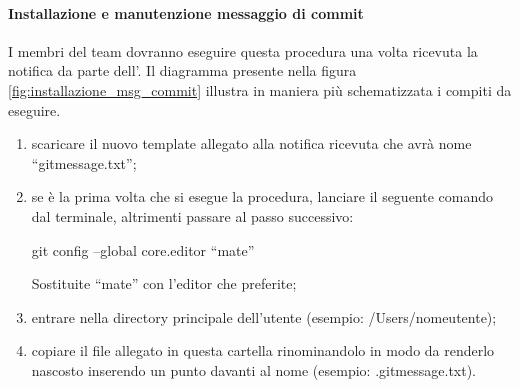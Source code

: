 			\paragraph{Installazione e manutenzione messaggio di commit}
			\label{sec:installazione_msg_commit}
			I membri del team dovranno eseguire questa procedura una volta ricevuta la notifica da parte dell'\roleAdministrator. \newline
			Il diagramma presente nella figura \ref{fig:installazione_msg_commit} illustra in maniera più schematizzata i compiti da eseguire.
				\begin{enumerate}
					\item scaricare il nuovo template allegato alla notifica ricevuta che avrà nome ``gitmessage.txt'';
					\item se è la prima volta che si esegue la procedura, lanciare il seguente comando dal terminale, altrimenti passare al passo successivo:
						\begin{center}
							git config --global core.editor ``mate''
						\end{center}
					\noindent
					Sostituite ``mate'' con l'editor che preferite;
					\item entrare nella directory principale dell'utente (esempio: /Users/nomeutente);
					\item copiare il file allegato in questa cartella rinominandolo in modo da renderlo nascosto inserendo un punto davanti al nome (esempio: .gitmessage.txt).
				\end{enumerate}

